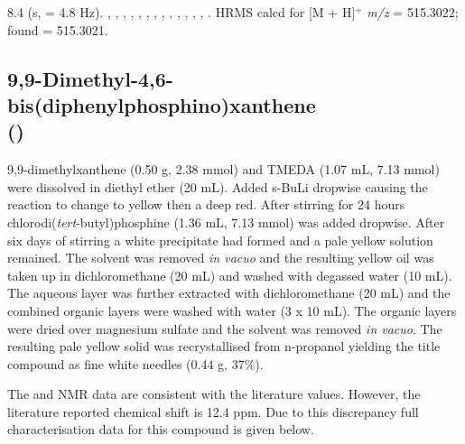 8.4 (s,  = 4.8 Hz).
,
,
,
,
,
,
,
,
,
,
,
,
,
.
HRMS calcd for  [M + H]$^+$ \emph{m/z} = 515.3022; found = 515.3021.


\subsection*{9,9-Dimethyl-4,6-bis(diphenylphosphino)xanthene \\(\tBuxantphos)}


9,9-dimethylxanthene (0.50 g, 2.38 mmol) and \gls{TMEDA} (1.07 mL, 7.13 mmol) were dissolved in diethyl ether (20 mL).  Added s-BuLi dropwise causing the reaction to change to yellow then a deep red.  After stirring for 24 hours chlorodi(\emph{tert}-butyl)phosphine (1.36 mL, 7.13 mmol) was added dropwise.  After six days of stirring a white precipitate had formed and a pale yellow solution remained.  The solvent was removed \emph{in vacuo} and the resulting yellow oil was taken up in dichloromethane (20 mL) and washed with degassed water (10 mL).  The aqueous layer was further extracted with dichloromethane (20 mL) and the combined organic layers were washed with water (3 x 10 mL).  The organic layers were dried over magnesium sulfate and the solvent was removed \emph{in vacuo}.  The resulting pale yellow solid was recrystallised from n-propanol yielding the title compound as fine white needles (0.44 g, 37\%).

The \proton{} and \carbon{} NMR data are consistent with the literature values.\cite{Mispelaere2005}  However, the literature reported \phosphorus{} chemical shift is 12.4 ppm.  Due to this discrepancy full characterisation data for this compound is given below.

